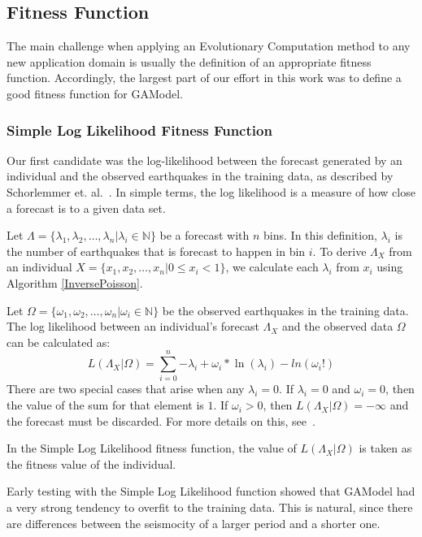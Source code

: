 \documentclass{sig-alternate}
\begin{document}
\subsection{Fitness Function}

The main challenge when applying an Evolutionary Computation method to
any new application domain is usually the definition of an appropriate
fitness function. Accordingly, the largest part of our effort in this
work was to define a good fitness function for GAModel.

\subsubsection{Simple Log Likelihood Fitness Function} %

Our first candidate was the log-likelihood between the forecast
generated by an individual and the observed earthquakes in the
training data, as described by Schorlemmer
et. al.~\cite{Schorlemmer2007}. In simple terms, the log likelihood is
a measure of how close a forecast is to a given data set.

Let $\Lambda = \{\lambda_1, \lambda_2, \dots, \lambda_n | \lambda_i
\in \mathbb{N}\}$ be a forecast with $n$ bins. In this definition,
$\lambda_i$ is the number of earthquakes that is forecast to happen in
bin $i$. To derive $\Lambda_X$ from an individual $X = \{x_1, x_2,
\dots, x_n | 0 \leq x_i < 1\}$, we calculate each $\lambda_i$ from
$x_i$ using Algorithm \ref{InversePoisson}.

Let $\Omega = \{\omega_1, \omega_2, \dots, \omega_n | \omega_i \in
\mathbb{N}\}$ be the observed earthquakes in the training data. The
log likelihood between an individual's forecast $\Lambda_X$ and the
observed data $\Omega$ can be calculated as:
\begin{equation}
  L(\Lambda_X|\Omega) = \sum_{i=0}^n {-\lambda_i +
    \omega_i*\ln(\lambda_i)-ln(\omega_i!)}
\end{equation}
There are two special cases that arise when any $\lambda_i = 0$. If
$\lambda_i = 0$ and $\omega_i = 0$, then the value of the sum for that
element is $1$. If $\omega_i > 0$, then $L(\Lambda_X|\Omega) =
-\infty$ and the forecast must be discarded. For more details on
this, see~\cite{Schorlemmer2007}.

In the Simple Log Likelihood fitness function, the value of
$L(\Lambda_X|\Omega)$ is taken as the fitness value of the individual.

Early testing with the Simple Log Likelihood function showed that
GAModel had a very strong tendency to overfit to the training
data. This is natural, since there are differences between the
seismocity of a larger period and a shorter one. 
\end{document}
